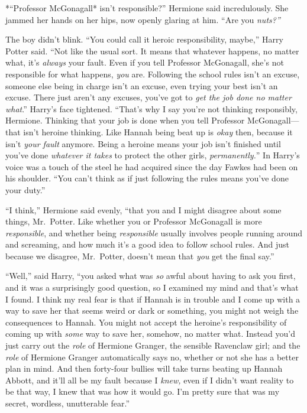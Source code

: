 *``Professor McGonagall* isn't responsible?'' Hermione said
incredulously. She jammed her hands on her hips, now openly glaring at
him. ``Are you \emph{nuts?''}

The boy didn't blink. ``You could call it heroic responsibility,
maybe,'' Harry Potter said. ``Not like the usual sort. It means that
whatever happens, no matter what, it's \emph{always} your fault. Even if
you tell Professor McGonagall, she's not responsible for what happens,
\emph{you} are. Following the school rules isn't an excuse, someone else
being in charge isn't an excuse, even trying your best isn't an excuse.
There just aren't any excuses, you've got to \emph{get the job done no
matter what}.'' Harry's face tightened. ``That's why I say you're not
thinking responsibly, Hermione. Thinking that your job is done when you
tell Professor McGonagall---that isn't heroine thinking. Like Hannah
being beat up is \emph{okay} then, because it isn't \emph{your fault}
anymore. Being a heroine means your job isn't finished until you've done
\emph{whatever it takes} to protect the other girls,
\emph{permanently.}'' In Harry's voice was a touch of the steel he had
acquired since the day Fawkes had been on his shoulder. ``You can't
think as if just following the rules means you've done your duty.''

``I think,'' Hermione said evenly, ``that you and I might disagree about
some things, Mr.~Potter. Like whether you or Professor McGonagall is
more \emph{responsible}, and whether being \emph{responsible} usually
involves people running around and screaming, and how much it's a good
idea to follow school rules. And just because we disagree, Mr.~Potter,
doesn't mean that \emph{you} get the final say.''

``Well,'' said Harry, ``you asked what was \emph{so} awful about having
to ask you first, and it was a surprisingly good question, so I examined
my mind and that's what I found. I think my real fear is that if Hannah
is in trouble and I come up with a way to save her that seems weird or
dark or something, you might not weigh the consequences to Hannah. You
might not accept the heroine's responsibility of coming up with
\emph{some} way to save her, somehow, no matter what. Instead you'd just
carry out the \emph{role} of Hermione Granger, the sensible Ravenclaw
girl; and the \emph{role} of Hermione Granger automatically says no,
whether or not she has a better plan in mind. And then forty-four
bullies will take turns beating up Hannah Abbott, and it'll all be my
fault because I \emph{knew,} even if I didn't want reality to be that
way, I knew that was how it would go. I'm pretty sure that was my
secret, wordless, unutterable fear.''


